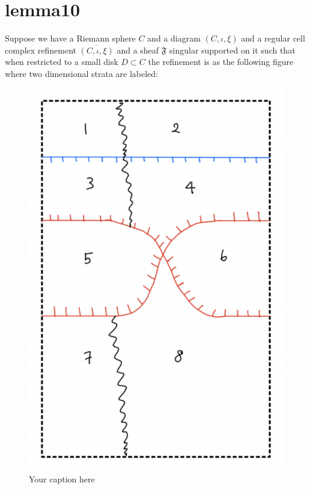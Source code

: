\section{lemma10}
\begin{lemma}
\end{lemma}

Suppose we have a Riemann sphere $C$ and a diagram $(C,\iota,\xi)$ and a regular cell complex refinement $\overline{(C,\iota,\xi)}$ and a sheaf $\mathfrak{F}$ singular supported on it such that when restricted to a small disk $D\subset C$  the refinement is as the following figure where two dimensional strata are labeled:

\begin{figure}[H] %
    \centering
    \includegraphics[scale = 0.95]{diagrams/lemma10/1.png} %
    \caption{Your caption here}
    \label{fig:your-label}
\end{figure}


